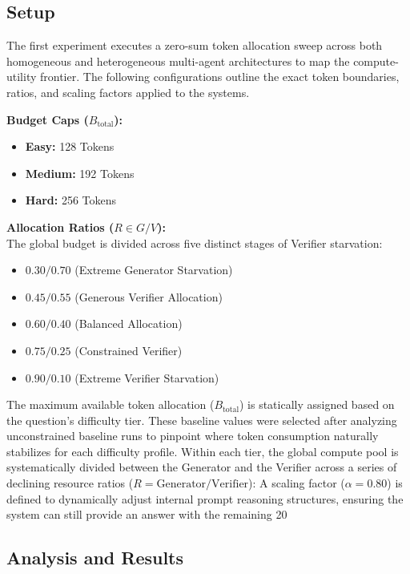 \documentclass[12pt, a4paper, oneside]{report}
\begin{document}
\subsection{Setup}
The first experiment executes a zero-sum token allocation sweep across both homogeneous 
and heterogeneous multi-agent architectures to map the compute-utility frontier. The
 following configurations outline the exact token boundaries, ratios, and scaling factors
  applied to the systems.

\textbf{Budget Caps ($B_{\text{total}}$):}
\begin{itemize}
    \item \textbf{Easy:} 128 Tokens
    \item \textbf{Medium:} 192 Tokens
    \item \textbf{Hard:} 256 Tokens
\end{itemize}

\vspace{0.5cm}

\textbf{Allocation Ratios ($R \in G/V$):} \\
The global budget is divided across five distinct stages of Verifier starvation:
\begin{itemize}
    \item $0.30 / 0.70$ (Extreme Generator Starvation)
    \item $0.45 / 0.55$ (Generous Verifier Allocation)
    \item $0.60 / 0.40$ (Balanced Allocation)
    \item $0.75 / 0.25$ (Constrained Verifier)
    \item $0.90 / 0.10$ (Extreme Verifier Starvation)
\end{itemize}

The maximum available token allocation ($B_{\text{total}}$) is statically assigned based on the question's difficulty tier. These baseline values were selected after analyzing unconstrained baseline runs to pinpoint where token consumption naturally stabilizes for each difficulty profile. Within each tier, the global compute pool is systematically divided between the Generator and the Verifier across a series of declining resource ratios ($R = \text{Generator}/\text{Verifier}$):
A scaling factor ($\alpha = 0.80$) is defined to dynamically adjust internal prompt reasoning structures, ensuring the system can still provide an answer with the remaining 20%



\subsection{Analysis and Results}
\end{document}
